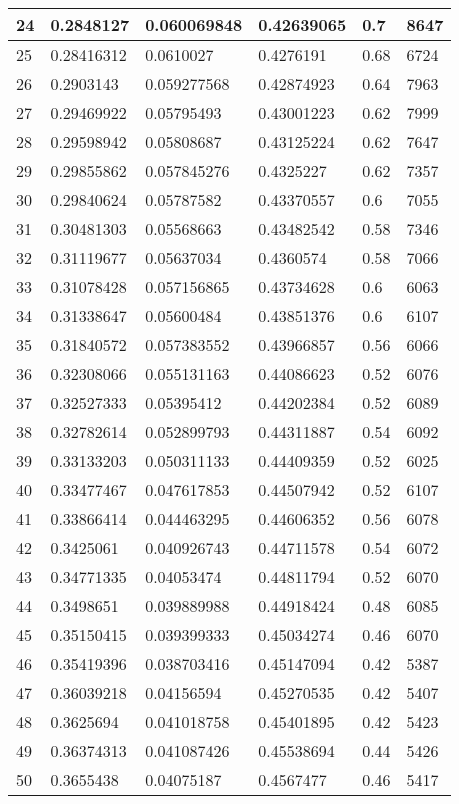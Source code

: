 \begin{longtable}{|l|l|l|l|l|l|}
24 & 0.2848127 & 0.060069848 & 0.42639065 & 0.7 & 8647 \\ \hline 
25 & 0.28416312 & 0.0610027 & 0.4276191 & 0.68 & 6724 \\ \hline 
26 & 0.2903143 & 0.059277568 & 0.42874923 & 0.64 & 7963 \\ \hline 
27 & 0.29469922 & 0.05795493 & 0.43001223 & 0.62 & 7999 \\ \hline 
28 & 0.29598942 & 0.05808687 & 0.43125224 & 0.62 & 7647 \\ \hline 
29 & 0.29855862 & 0.057845276 & 0.4325227 & 0.62 & 7357 \\ \hline 
30 & 0.29840624 & 0.05787582 & 0.43370557 & 0.6 & 7055 \\ \hline 
31 & 0.30481303 & 0.05568663 & 0.43482542 & 0.58 & 7346 \\ \hline 
32 & 0.31119677 & 0.05637034 & 0.4360574 & 0.58 & 7066 \\ \hline 
33 & 0.31078428 & 0.057156865 & 0.43734628 & 0.6 & 6063 \\ \hline 
34 & 0.31338647 & 0.05600484 & 0.43851376 & 0.6 & 6107 \\ \hline 
35 & 0.31840572 & 0.057383552 & 0.43966857 & 0.56 & 6066 \\ \hline 
36 & 0.32308066 & 0.055131163 & 0.44086623 & 0.52 & 6076 \\ \hline 
37 & 0.32527333 & 0.05395412 & 0.44202384 & 0.52 & 6089 \\ \hline 
38 & 0.32782614 & 0.052899793 & 0.44311887 & 0.54 & 6092 \\ \hline 
39 & 0.33133203 & 0.050311133 & 0.44409359 & 0.52 & 6025 \\ \hline 
40 & 0.33477467 & 0.047617853 & 0.44507942 & 0.52 & 6107 \\ \hline 
41 & 0.33866414 & 0.044463295 & 0.44606352 & 0.56 & 6078 \\ \hline 
42 & 0.3425061 & 0.040926743 & 0.44711578 & 0.54 & 6072 \\ \hline 
43 & 0.34771335 & 0.04053474 & 0.44811794 & 0.52 & 6070 \\ \hline 
44 & 0.3498651 & 0.039889988 & 0.44918424 & 0.48 & 6085 \\ \hline 
45 & 0.35150415 & 0.039399333 & 0.45034274 & 0.46 & 6070 \\ \hline 
46 & 0.35419396 & 0.038703416 & 0.45147094 & 0.42 & 5387 \\ \hline 
47 & 0.36039218 & 0.04156594 & 0.45270535 & 0.42 & 5407 \\ \hline 
48 & 0.3625694 & 0.041018758 & 0.45401895 & 0.42 & 5423 \\ \hline 
49 & 0.36374313 & 0.041087426 & 0.45538694 & 0.44 & 5426 \\ \hline 
50 & 0.3655438 & 0.04075187 & 0.4567477 & 0.46 & 5417 \\ \hline 
\end{longtable}